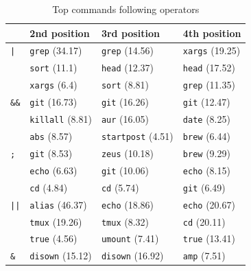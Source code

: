 \begin{table}
    \caption{Top commands following operators}
    \label{tab:operators}
\begin{tabular}{ll|l|l}    
    \toprule
     & 2nd position & 3rd position & 4th position \\
    \midrule
    \verb!|! & \verb|grep| {\small (\num{34.17})} & \verb|grep| {\small (\num{14.56})} & \verb|xargs| {\small (\num{19.25})} \\     
             & \verb|sort| {\small (\num{11.1})} & \verb|head| {\small (\num{12.37})}& \verb|head| {\small (\num{17.52})}\\ 
             & \verb|xargs| {\small (\num{6.4})} & \verb|sort| {\small (\num{8.81})} & \verb|grep| {\small (\num{11.35})}\\ 
    \midrule
    \verb!&&! & \verb|git| {\small (\num{16.73})} & \verb|git| {\small (\num{16.26})} & \verb|git| {\small (\num{12.47})} \\ 
             & \verb|killall| {\small (\num{8.81})} & \verb|aur| {\small (\num{16.05})} & \verb|date| {\small (\num{8.25})}\\ 
             & \verb|abs| {\small (\num{8.57})} & \verb|startpost| {\small (\num{4.51})} & \verb|brew| {\small (\num{6.44})} \\ 
    \midrule
    \verb!;! & \verb|git| {\small (\num{8.53})} & \verb|zeus| {\small (\num{10.18})} & \verb|brew| {\small (\num{9.29})}\\ 
             & \verb|echo| {\small (\num{6.63})}& \verb|git| {\small (\num{10.06})}  & \verb|echo| {\small (\num{8.15})} \\ 
             &  \verb|cd| {\small (\num{4.84})} & \verb|cd| {\small (\num{5.74})} &  \verb|git| {\small (\num{6.49})}\\ 
    \midrule
    \verb!||! & \verb|alias| {\small (\num{46.37})} & \verb|echo| {\small (\num{18.86})} & \verb|echo| {\small (\num{20.67})} \\ 
        & \verb|tmux| {\small (\num{19.26})} & \verb|tmux| {\small (\num{8.32})}  &  \verb|cd| {\small (\num{20.11})} \\ 
        & \verb|true| {\small (\num{4.56})} &  \verb|umount| {\small (\num{7.41})} & \verb|true| {\small (\num{13.41})}\\ 
        \midrule
    \verb!&! & \verb|disown| {\small (\num{15.12})} & \verb|disown| {\small (\num{16.92})} & \verb|amp| {\small (\num{7.51})} \\

\end{tabular}
\end{table}
